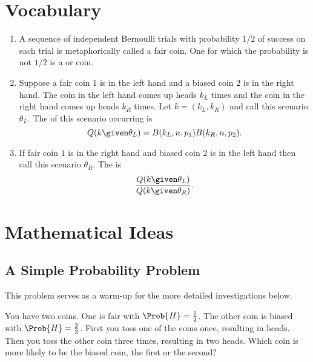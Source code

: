 \documentclass[12pt]{article}
\begin{document}
\hr

\section*{Vocabulary}
\begin{enumerate}
    \item
        A sequence of independent Bernoulli trials with probability \(
        1/2 \) of success on each trial is metaphorically called a 
        {fair} coin.  One for which the probability is not \( 1/2 \) is
        a  or  coin.
    \item
        Suppose a fair coin \( 1 \) is in the left hand and a biased
        coin \( 2 \) is in the right hand.  The coin in the left hand
        comes up heads \( k_L \) times and the coin in the right hand
        comes up heads \( k_R \) times.  Let \( k = (k_L, k_R) \) and
        call this scenario \( \theta_L \).  The  of
        this scenario occurring is
        \[
            Q(k \given \theta_L) = B(k_L, n, p_1)B(k_R, n, p_2).
        \]
    \item
        If fair coin \( 1 \) is in the right hand and biased coin \( 2 \)
        is in the left hand then call this scenario \( \theta_R \).  The
         is
        \[
            \frac{Q(k \given \theta_L)}{Q(k \given \theta_R)}.
        \]
\end{enumerate}

\hr

\section*{Mathematical Ideas}

\subsection*{A Simple Probability Problem}

This problem serves as a warm-up for the more detailed investigations
below.

You have two coins.  One is fair with \( \Prob{H} = \frac{1}{2} \).  The
other coin is biased with \( \Prob{H} = \frac{2}{3} \).  First you toss
one of the coins once, resulting in heads.  Then you toss the other coin
three times, resulting in two heads.  Which coin is more likely to be
the biased coin, the first or the second?
\end{document}
